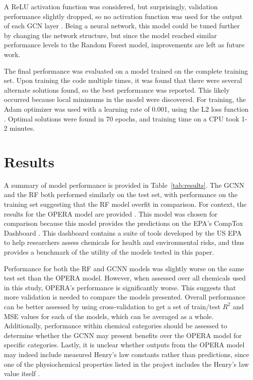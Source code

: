 \documentclass[12pt, oneside]{article}   	%
\begin{document}
A ReLU activation function was considered, but surprisingly, validation performance slightly dropped, so no activation function was used for the output of each GCN layer \cite{Agarap2018}. Being a neural network, this model could be tuned further by changing the network structure, but since the model reached similar performance levels to the Random Forest model, improvements are left as future work.

The final performance was evaluated on a model trained on the complete training set. Upon training the code multiple times, it was found that there were several alternate solutions found, so the best performance was reported. This likely occurred because local minimums in the model were discovered. For training, the Adam optimizer was used with a learning rate of 0.001, using the L2 loss function \cite{kingma2014}. Optimal solutions were found in 70 epochs, and training time on a CPU took 1-2 minutes. 

\section{Results}
A summary of model performance is provided in Table~\ref{tab:results}. The GCNN and the RF both performed similarly on the test set, with performance on the training set suggesting that the RF model overfit in comparison. For context, the results for the OPERA model are provided \cite{Mansouri2018}. This model was chosen for comparison because this model provides the predictions on the EPA's CompTox Dashboard \cite{williams2017}.  This dashboard contains a suite of tools developed by the US EPA to help researchers assess chemicals for health and environmental risks, and thus provides a benchmark of the utility of the models tested in this paper.

	Performance for both the RF and GCNN models was slightly worse on the same test set than the OPERA model. However, when assessed over all chemicals used in this study, OPERA's performance is significantly worse. This suggests that more validation is needed to compare the models presented. Overall performance can be better assessed by using cross-validation to get a set of train/test $R^2$ and MSE values for each of the models, which can be averaged as a whole. Additionally, performance within chemical categories should be assessed to determine whether the GCNN may present benefits over the OPERA model for specific categories. Lastly, it is unclear whether outputs from the OPERA model may indeed include measured Henry's law constants rather than predictions, since one of the physiochemical properties listed in the project includes the Henry's law value itself \cite{Mansouri2018}. 
\end{document}
